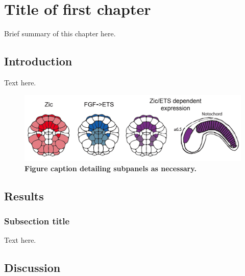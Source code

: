 \chapter{Title of first chapter}
\label{chap:Title of first chapter}

Brief summary of this chapter here.

\section{Introduction}

Text here.

\begin{figure}[h]
    \centering
    \includegraphics[scale=0.25]{1_figures-and-files/Fig1_ZicEts-Expression.png}
    \caption[Figure caption title.]{\textbf{Figure caption detailing subpanels as necessary.}}
    \label{fig:1 figure title for table of contents}
\end{figure}

\section{Results}

\subsection{Subsection title}

Text here.

\section{Discussion}

